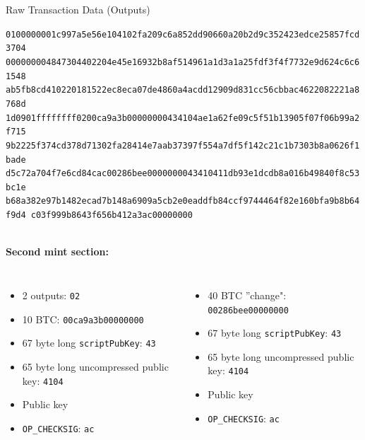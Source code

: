 \documentclass[]{beamer}
\begin{document}
\begin{frame}{Raw Transaction Data (Outputs)}
\begin{scriptsize}
\texttt{\textcolor{black!50}{0100000001c997a5e56e104102fa209c6a852dd90660a20b2d9c352423edce25857fcd3704
000000004847304402204e45e16932b8af514961a1d3a1a25fdf3f4f7732e9d624c6c61548
ab5fb8cd410220181522ec8eca07de4860a4acdd12909d831cc56cbbac4622082221a8768d
1d0901ffffffff}{\alert<1>{02}\alert<2>{00ca9a3b00000000}\alert<3>{43}\alert<4>{4104}\alert<5>{ae1a62fe09c5f51b13905f07f06b99a2f715
9b2225f374cd378d71302fa28414e7aab37397f554a7df5f142c21c1b7303b8a0626f1bade
d5c72a704f7e6cd84c}\alert<6>{ac}\alert<7>{00286bee00000000}\alert<8>{43}\alert<9>{4104}\alert<10>{11db93e1dcdb8a016b49840f8c53bc1e
b68a382e97b1482ecad7b148a6909a5cb2e0eaddfb84ccf9744464f82e160bfa9b8b64f9d4
c03f999b8643f656b412a3}\alert<11>{ac}}\textcolor{black!50}{00000000}}
\end{scriptsize}
\vspace{1em}
\scriptsize \\
\textbf{Second mint section:}\\
\begin{columns}[T]
\begin{itemize}
	\item \alert<1>{2 outputs: \texttt{02}}
	\item \alert<2>{10 BTC: \texttt{00ca9a3b00000000}}
	\item \alert<3>{67 byte long \texttt{scriptPubKey}: \texttt{43}}
	\item \alert<4>{65 byte long uncompressed public key: \texttt{4104}}
	\item \alert<5>{Public key}
	\item \alert<6>{\texttt{OP\_CHECKSIG}: \texttt{ac}}
\end{itemize}
\begin{itemize}
	\item \alert<7>{40 BTC ''change": \texttt{00286bee00000000}}
	\item \alert<8>{67 byte long \texttt{scriptPubKey}: \texttt{43}}
	\item \alert<9>{65 byte long uncompressed public key: \texttt{4104}}
	\item \alert<10>{Public key}
	\item \alert<11>{\texttt{OP\_CHECKSIG}: \texttt{ac}}
\end{itemize}
\end{columns}

\end{frame}
\end{document}
